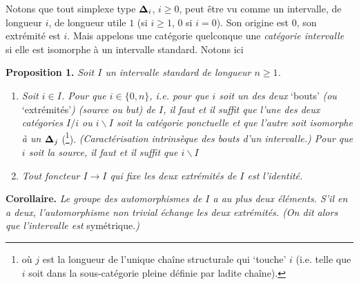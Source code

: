 Notons que tout simplexe type $\boldsymbol{\Delta}_i$, $i\geq 0$, peut être vu comme un intervalle, de longueur $i$, de longueur utile $1$ (si $i\geq 1$, $0$ si $i=0$). Son origine est $0$, son extrémité est $i$. Mais appelons une catégorie quelconque une \textit{catégorie intervalle} si elle est isomorphe à un intervalle standard. Notons ici

\textbf{Proposition 1.} \textit{Soit $I$ un intervalle standard de longueur $n\geq 1$.}

\begin{enumerate}
\item[\textit{a)}] \textit{Soit $i\in I$. Pour que $i\in\{0,n\}$, i.e. pour que $i$ soit un des deux} ‘bouts’ \textit{(ou} ‘extrémités’\textit{) (source ou but) de $I$, il faut et il suffit que l'une des deux catégories $I/i$ ou $i\backslash I$ soit la catégorie ponctuelle et que l'autre soit isomorphe à un} $\boldsymbol{\Delta}_j$ (\footnote{où $j$ est la longueur de l'unique chaîne structurale qui ‘touche’ $i$ (i.e. telle que $i$ soit dans la sous-catégorie pleine définie par ladite chaîne).}). \textit{(Caractérisation intrinsèque des bouts d'un intervalle.) Pour que $i$ soit la source, il faut et il suffit que $i\backslash I$}
\item[\textit{b)}] \textit{Tout foncteur $I\longrightarrow I$ qui fixe les deux extrémités de $I$ est l'identité.}
\end{enumerate}

\textbf{Corollaire.} \textit{Le groupe des automorphismes de $I$ a au plus deux éléments. S'il en a deux, l'automorphisme non trivial échange les deux extrémités. (On dit alors que l'intervalle est} symétrique.\textit{)}

